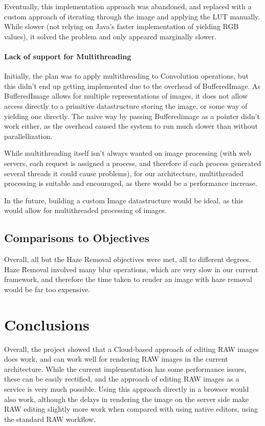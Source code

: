 \documentclass[10pt,a4paper]{article}
\begin{document}
Eventually, this implementation approach was abandoned, and replaced with a custom approach of iterating through the image and applying the LUT
manually. While slower (not relying on Java's faster implementation of yielding RGB values), it solved the problem and only appeared marginally slower.

\paragraph{Lack of support for Multithreading}
Initially, the plan was to apply multithreading to Convolution operations, but this didn't end up getting implemented due to the overhead of BufferedImage.
As BufferedImage allows for multiple representations of images, it does not allow access directly to a primitive datastructure storing the image, or some way of
yielding one directly. The naive way by passing Bufferedimage as a pointer didn't work either, as the overhead caused the system to run much slower than without parallellization.

While multithreading itself isn't always wanted on image processing (with web servers, each request is assigned a process, and therefore if each process generated several threads it could
cause problems), for our architecture, multithreaded processing is suitable and encouraged, as there would be a performance increase.

In the future, building a custom Image datastructure would be ideal, as this would allow for multithreaded processing of images.

\subsection{Comparisons to Objectives}
Overall, all but the Haze Removal objectives were met, all to different degrees. Haze Removal involved many blur operations, which are very slow in our current framework, and therefore the
time taken to render an image with haze removal would be far too expensive. 
\section{Conclusions}
Overall, the project showed that a Cloud-based approach of editing RAW images does work, and can work well for rendering RAW images in the current architecture.
While the current implementation has some performance issues, these can be easily rectified, and the approach of editing RAW images as a service is very much possible.
Using this approach directly in a browser would also work, although the delays in rendering the image on the server side make RAW editing slightly more work when compared with
using native editors, using the standard RAW workflow.



\end{document}

